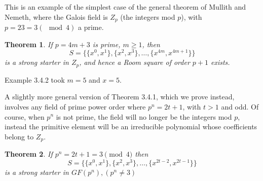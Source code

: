 \documentclass[
  11pt,
  a4paper]{book}
\newtheorem{theorem}{Theorem}
\begin{document}
This is an example of the simplest case of the general
theorem of Mullith and Nemeth, where the Galois field is \(Z_p\)
(the integers mod \(p\)), with \(p = 23 = 3( \mod 4)\) a prime.

\begin{theorem}
If $p = 4m  +3$ is prime, $m \geq 1$, then
$$S = \{\{x^0, x^1\}, \{x^2, x^3\}, \ldots, \{x^{4m}, x^{4m+1}\}\}$$
is a strong starter in $Z_p$, and hence a Room square of
order $p + 1$ exists.
\end{theorem}

Example 3.4.2 took \(m = 5\) and \(x = 5\).

A slightly more general version of Theorem 3.4.1, which we
prove instead, involves any field of prime power order where
\(p^n = 2t + 1\), with \(t > 1\) and odd. Of course, when \(p^n\) is not
prime, the field will no longer be the integers mod \(p\),
instead the primitive element will be an irreducible
polynomial whose coefficients belong to \(Z_p\).

\begin{theorem}
If $p^n = 2t + 1 = 3\pmod 4$ then
$$S = \{\{x^0, x^1\}, \{x^2, x^3\}, \ldots, \{x^{2t - 2}, x^{2t - 1}\}\}$$
is a strong starter in $GF(p^n), (p^n \neq 3)$
\end{theorem}
\end{document}
